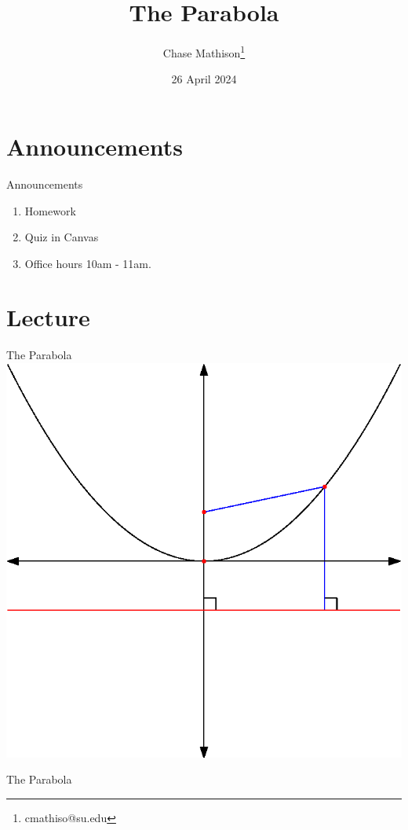 \documentclass[presentation]{beamer}
\institute[SU]{Shenandoah University}
\author{Chase Mathison\thanks{cmathiso@su.edu}}
\date{26 April 2024}
\title{The Parabola}
\begin{document}
\maketitle

\section{Announcements}
\label{sec:org5928304}
\begin{frame}[label={sec:org6ea3409}]{Announcements}
\begin{enumerate}
\item Homework
\item Quiz in Canvas
\item Office hours 10am - 11am.
\end{enumerate}
\end{frame}

\section{Lecture}
\label{sec:orga384734}
\begin{frame}[label={sec:orgb126bd9}]{The Parabola}
\includegraphics{./parab_x_orig}
\end{frame}


\begin{frame}[label={sec:orga2b2941}]{The Parabola}
\end{frame}
\end{document}
